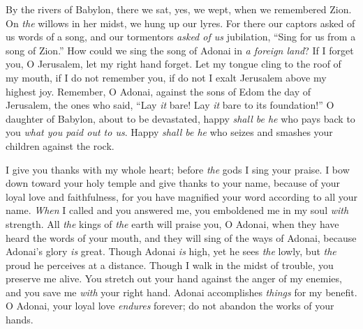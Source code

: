 \begin{biblechapter} %
 By the rivers of Babylon, 
there we sat, yes, we wept, 
when we remembered Zion.
\verse On \textit{the} willows in her midst, 
we hung up our lyres.
\verse For there our captors asked of us 
words of a song, 
and our tormentors \textit{asked of us} jubilation, 
“Sing for us from a song of Zion.”
\verse How could we sing the song of Adonai 
in \textit{a foreign land}?
\verse If I forget you, O Jerusalem, 
let my right hand forget.
\verse Let my tongue cling to the roof of my mouth, 
if I do not remember you, 
if do not I exalt Jerusalem 
above my highest joy.
\verse Remember, O Adonai, against the sons of Edom 
the day of Jerusalem, 
the ones who said, “Lay \textit{it} bare! Lay \textit{it} bare 
to its foundation!”
\verse O daughter of Babylon, about to be devastated, 
happy \textit{shall be he} who pays back to you 
\textit{what you paid out to us}.
\verse Happy \textit{shall be he} who seizes 
and smashes your children 
against the rock.
\end{biblechapter}

\begin{biblechapter} %
 I give you thanks with my whole heart; 
before \textit{the} gods I sing your praise.
\verse I bow down toward your holy temple 
and give thanks to your name, 
because of your loyal love and faithfulness, 
for you have magnified your word according to all your name.
\verse \textit{When} I called and you answered me, 
you emboldened me in my soul \textit{with} strength.
\verse All \textit{the} kings of \textit{the} earth 
will praise you, O Adonai, 
when they have heard the words of your mouth,
\verse and they will sing of the ways of Adonai, 
because Adonai’s glory \textit{is} great.
\verse Though Adonai \textit{is} high, yet he sees \textit{the} lowly, 
but \textit{the} proud he perceives at a distance.
\verse Though I walk in the midst of trouble, 
you preserve me alive. 
You stretch out your hand against the anger of my enemies, 
and you save me \textit{with} your right hand.
\verse Adonai accomplishes \textit{things} for my benefit. 
O Adonai, your loyal love \textit{endures} forever; 
do not abandon the works of your hands.
\end{biblechapter}

